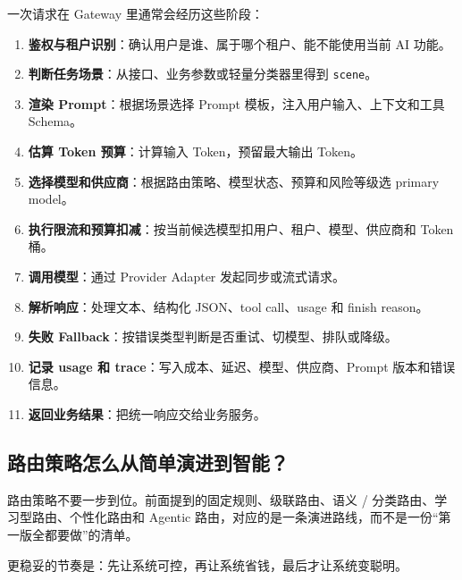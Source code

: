 \documentclass[9pt,a4paper,twocolumn]{ctexart}
\begin{document}
一次请求在 Gateway 里通常会经历这些阶段：


\begin{enumerate}[itemsep=1pt, topsep=2pt]
  \item \textbf{鉴权与租户识别}：确认用户是谁、属于哪个租户、能不能使用当前 AI 功能。
  \item \textbf{判断任务场景}：从接口、业务参数或轻量分类器里得到 \texttt{scene}。
  \item \textbf{渲染 Prompt}：根据场景选择 Prompt 模板，注入用户输入、上下文和工具 Schema。
  \item \textbf{估算 Token 预算}：计算输入 Token，预留最大输出 Token。
  \item \textbf{选择模型和供应商}：根据路由策略、模型状态、预算和风险等级选 primary model。
  \item \textbf{执行限流和预算扣减}：按当前候选模型扣用户、租户、模型、供应商和 Token 桶。
  \item \textbf{调用模型}：通过 Provider Adapter 发起同步或流式请求。
  \item \textbf{解析响应}：处理文本、结构化 JSON、tool call、usage 和 finish reason。
  \item \textbf{失败 Fallback}：按错误类型判断是否重试、切模型、排队或降级。
  \item \textbf{记录 usage 和 trace}：写入成本、延迟、模型、供应商、Prompt 版本和错误信息。
  \item \textbf{返回业务结果}：把统一响应交给业务服务。
\end{enumerate}


\subsection*{路由策略怎么从简单演进到智能？}


路由策略不要一步到位。前面提到的固定规则、级联路由、语义 / 分类路由、学习型路由、个性化路由和 Agentic 路由，对应的是一条演进路线，而不是一份“第一版全都要做”的清单。



更稳妥的节奏是：先让系统可控，再让系统省钱，最后才让系统变聪明。
\end{document}
